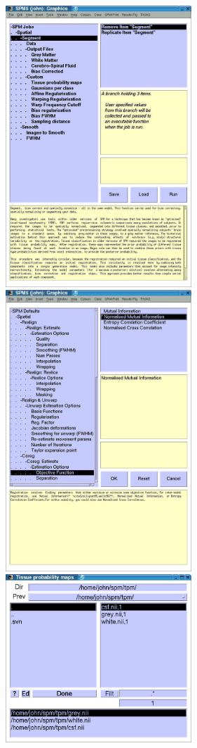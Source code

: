 \documentclass[a4paper,titlepage]{book}
\begin{document}
\begin{figure}
\begin{center}
\includegraphics[width=70mm]{images/ui1}
\includegraphics[width=70mm]{images/ui2}
\includegraphics[width=70mm]{images/ui3}

\end{center}
\end{figure}
\end{document}
